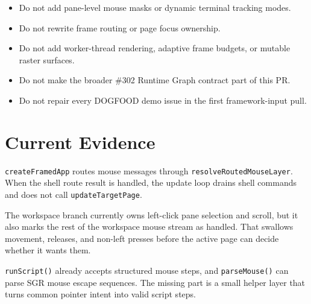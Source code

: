 \begin{itemize}
\tightlist
\item
  Do not add pane-level mouse masks or dynamic terminal tracking modes.
\item
  Do not rewrite frame routing or page focus ownership.
\item
  Do not add worker-thread rendering, adaptive frame budgets, or mutable raster surfaces.
\item
  Do not make the broader \#302 Runtime Graph contract part of this PR.
\item
  Do not repair every DOGFOOD demo issue in the first framework-input pull.
\end{itemize}

\section{Current Evidence}\label{record-165-current-evidence}

\texttt{c\allowbreak{}r\allowbreak{}e\allowbreak{}a\allowbreak{}t\allowbreak{}e\allowbreak{}F\allowbreak{}r\allowbreak{}a\allowbreak{}m\allowbreak{}e\allowbreak{}d\allowbreak{}A\allowbreak{}p\allowbreak{}p} routes mouse messages through \texttt{r\allowbreak{}e\allowbreak{}s\allowbreak{}o\allowbreak{}l\allowbreak{}v\allowbreak{}e\allowbreak{}R\allowbreak{}o\allowbreak{}u\allowbreak{}t\allowbreak{}e\allowbreak{}d\allowbreak{}M\allowbreak{}o\allowbreak{}u\allowbreak{}s\allowbreak{}e\allowbreak{}L\allowbreak{}a\allowbreak{}y\allowbreak{}e\allowbreak{}r}. When the shell route result is handled, the update loop drains shell commands and does not call \texttt{u\allowbreak{}p\allowbreak{}d\allowbreak{}a\allowbreak{}t\allowbreak{}e\allowbreak{}T\allowbreak{}a\allowbreak{}r\allowbreak{}g\allowbreak{}e\allowbreak{}t\allowbreak{}P\allowbreak{}a\allowbreak{}g\allowbreak{}e}.

The workspace branch currently owns left-click pane selection and scroll, but it also marks the rest of the workspace mouse stream as handled. That swallows movement, releases, and non-left presses before the active page can decide whether it wants them.

\texttt{r\allowbreak{}u\allowbreak{}n\allowbreak{}S\allowbreak{}c\allowbreak{}r\allowbreak{}i\allowbreak{}p\allowbreak{}t\allowbreak{}(\allowbreak{})} already accepts structured mouse steps, and \texttt{p\allowbreak{}a\allowbreak{}r\allowbreak{}s\allowbreak{}e\allowbreak{}M\allowbreak{}o\allowbreak{}u\allowbreak{}s\allowbreak{}e\allowbreak{}(\allowbreak{})} can parse SGR mouse escape sequences. The missing part is a small helper layer that turns common pointer intent into valid script steps.

